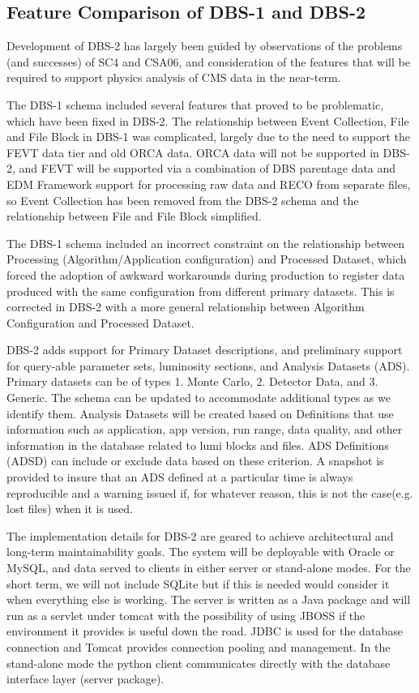\documentclass{cmspaper}
\begin{document}
\subsection{Feature Comparison of DBS-1 and DBS-2}

Development of DBS-2 has largely been guided by observations of the
problems (and successes) of SC4 and CSA06, and consideration of the
features that will be required to support physics analysis of CMS
data in the near-term.

The DBS-1 schema included several features that proved to be
problematic, which have been fixed in DBS-2.  The relationship
between Event Collection, File and File Block in DBS-1 was
complicated, largely due to the need to support the FEVT data
tier and old ORCA data.  ORCA data will not be supported in
DBS-2, and FEVT will be supported via a combination of DBS
parentage data and EDM Framework support for processing raw
data and RECO from separate files, so Event Collection has been
removed from the DBS-2 schema and the relationship between
File and File Block simplified.

The DBS-1 schema included an incorrect constraint on the
relationship between Processing (Algorithm/Application
configuration) and Processed Dataset, which forced the
adoption of awkward workarounds during production to
register data produced with the same configuration from
different primary datasets.  This is corrected in DBS-2
with a more general relationship between Algorithm Configuration
and Processed Dataset.

DBS-2 adds support for Primary Dataset descriptions,
and preliminary support for query-able parameter sets,
luminosity sections, and Analysis Datasets (ADS). Primary
datasets can be of types 1. Monte Carlo, 2. Detector Data, 
and 3. Generic. The schema can be updated to accommodate additional 
types as we identify them. Analysis Datasets will be created based on
Definitions that use information  such as application, app version, 
run range, data quality, and other information in the database related 
to lumi blocks and files. ADS Definitions (ADSD) can include or exclude 
data based on these criterion.
A snapshot is provided to insure that an ADS defined at a particular 
time is always reproducible and a warning issued if, for whatever 
reason, this is not the case(e.g. lost files) when it is used. 

The implementation details for DBS-2 are geared to achieve 
architectural and long-term maintainability goals.  The 
system will be deployable with Oracle or MySQL, and  data 
served to clients in either server or stand-alone modes. 
For the short term, we will not include SQLite but if this 
is needed would consider it when everything else is working. 
The server is written as a Java package and will run as a servlet under 
tomcat with the possibility of using JBOSS if the environment 
it provides is useful down the road. JDBC is used for the database connection
and Tomcat provides connection pooling and management.
 In the stand-alone mode the python client communicates directly with the 
database interface layer (server package).    
\end{document}
